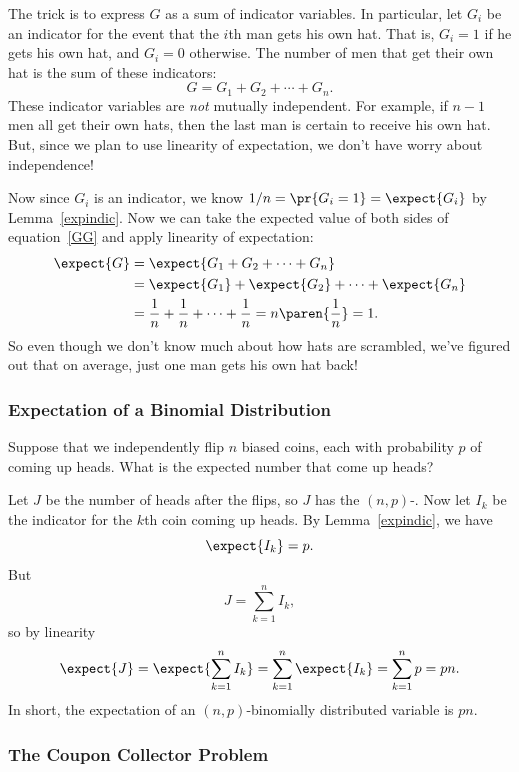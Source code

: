 The trick is to express $G$ as a sum of indicator variables.  In
particular, let $G_i$ be an indicator for the event that the $i$th man
gets his own hat.  That is, $G_i = 1$ if he gets his own hat, and $G_i =
0$ otherwise.  The number of men that get their own hat is the sum of
these indicators:
%
\begin{equation}\label{GG}
G = G_1 + G_2 + \cdots + G_n.
\end{equation}
%
These indicator variables are \textit{not} mutually independent.  For
example, if $n-1$ men all get their own hats, then the last man is
certain to receive his own hat.  But, since we plan to use linearity
of expectation, we don't have worry about independence!

Now since $G_i$ is an indicator, we know $1/n = \pr{G_i=1} = \expect{G_i}$
by Lemma~\ref{expindic}.  Now we can take the expected value of both sides
of equation~\eqref{GG} and apply linearity of expectation:
\begin{align*}
\expect{G} & = \expect{G_1 + G_2 + \cdots + G_n} \\
       & = \expect{G_1} + \expect{G_2} + \cdots + \expect{G_n}\\
       & = \frac{1}{n} + \frac{1}{n} + \cdots + \frac{1}{n} =
       n\paren{\frac{1}{n}} = 1.
\end{align*}
So even though we don't know much about how hats are scrambled, we've
figured out that on average, just one man gets his own hat back!


\subsubsection{Expectation of a Binomial Distribution}
Suppose that we independently flip $n$ biased coins, each with probability
$p$ of coming up heads.  What is the expected number that come up heads?

Let $J$ be the number of heads after the flips, so $J$ has the
$(n,p)$-.  Now let $I_k$ be the indicator for the
$k$th coin coming up heads.  By Lemma~\ref{expindic}, we have
\[
\expect{I_k} = p.
\]
But
\[
J = \sum_{k=1}^n I_k,
\]
so by linearity
\[
\expect{J} = \expect{\sum_{k=1}^n I_k} = \sum_{k=1}^n \expect{I_k} =
\sum_{k=1}^n p = pn.
\]
In short, the expectation of an $(n,p)$-binomially distributed variable is
$pn$.


\subsubsection{The Coupon Collector Problem}


